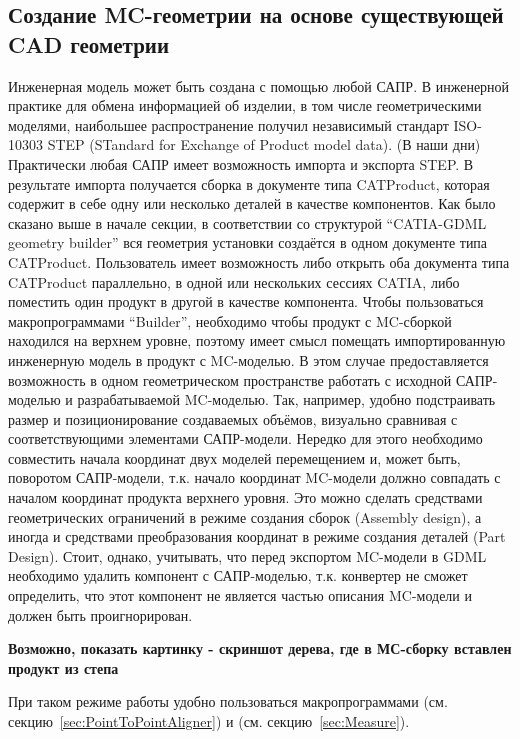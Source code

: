 \subsection{Создание MC-геометрии на основе существующей CAD геометрии}\label{sec:MCfromCAD}

Инженерная модель может быть создана с помощью любой САПР. В инженерной практике для обмена информацией об изделии, в том числе геометрическими моделями, наибольшее распространение получил независимый стандарт ISO-10303 STEP (STandard for Exchange of Product model data). (\todo В наши дни) Практически любая САПР имеет возможность импорта и экспорта STEP. В результате импорта получается сборка в документе типа CATProduct, которая содержит в себе одну или несколько деталей в качестве компонентов.
Как было сказано выше в начале секции, в соответствии со структурой ``CATIA-GDML geometry builder'' вся геометрия установки создаётся в одном документе типа CATProduct. 
Пользователь имеет возможность либо открыть оба документа типа CATProduct параллельно, в одной или нескольких сессиях CATIA, либо поместить один продукт в другой в качестве компонента. Чтобы пользоваться макропрограммами ``Builder'', необходимо чтобы продукт с MC-сборкой находился на верхнем уровне, поэтому имеет смысл помещать импортированную инженерную модель в продукт с MC-моделью. В этом случае предоставляется возможность в одном геометрическом пространстве работать с исходной САПР-моделью и разрабатываемой MC-моделью. Так, например, удобно подстраивать размер и позиционирование создаваемых объёмов, визуально сравнивая с соответствующими элементами САПР-модели. Нередко для этого необходимо совместить начала координат двух моделей перемещением и, может быть, поворотом САПР-модели, т.к. начало координат MC-модели должно совпадать с началом координат продукта верхнего уровня. Это можно сделать средствами геометрических ограничений в режиме создания сборок (Assembly design), а иногда и средствами преобразования координат в режиме создания деталей (Part Design). Стоит, однако, учитывать, что перед экспортом MC-модели в GDML необходимо удалить компонент с САПР-моделью, т.к. конвертер  не сможет определить, что этот компонент не является частью описания MC-модели и должен быть проигнорирован.

\textbf{Возможно, показать картинку - скриншот дерева, где в МС-сборку вставлен продукт из степа}

При таком режиме работы удобно пользоваться макропрограммами  (см. секцию~\ref{sec:PointToPointAligner}) и  (см. секцию~\ref{sec:Measure}).

